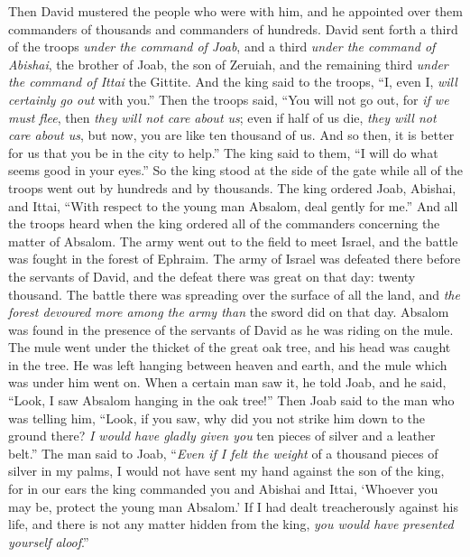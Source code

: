 \begin{biblechapter} %
 Then David mustered the people who were with him, and he appointed over them commanders of thousands and commanders of hundreds.
\verse David sent forth a third of the troops \textit{under the command of Joab}, and a third \textit{under the command of Abishai}, the brother of Joab, the son of Zeruiah, and the remaining third \textit{under the command of Ittai} the Gittite. And the king said to the troops, “I, even I, \textit{will certainly go out} with you.”
\verse Then the troops said, “You will not go out, for \textit{if we must flee}, then \textit{they will not care about us}; even if half of us die, \textit{they will not care about us}, but now, you are like ten thousand of us. And so then, it is better for us that you be in the city to help.”
\verse The king said to them, “I will do what seems good in your eyes.” So the king stood at the side of the gate while all of the troops went out by hundreds and by thousands.
\verse The king ordered Joab, Abishai, and Ittai, “With respect to the young man Absalom, deal gently for me.” And all the troops heard when the king ordered all of the commanders concerning the matter of Absalom.
\verse The army went out to the field to meet Israel, and the battle was fought in the forest of Ephraim.
\verse The army of Israel was defeated there before the servants of David, and the defeat there was great on that day: twenty thousand.
\verse The battle there was spreading over the surface of all the land, and \textit{the forest devoured more among the army than} the sword did on that day.
\verse Absalom was found in the presence of the servants of David as he was riding on the mule. The mule went under the thicket of the great oak tree, and his head was caught in the tree. He was left hanging between heaven and earth, and the mule which was under him went on.
\verse When a certain man saw it, he told Joab, and he said, “Look, I saw Absalom hanging in the oak tree!”
\verse Then Joab said to the man who was telling him, “Look, if you saw, why did you not strike him down to the ground there? \textit{I would have gladly given you} ten pieces of silver and a leather belt.”
\verse The man said to Joab, “\textit{Even if I felt the weight} of a thousand pieces of silver in my palms, I would not have sent my hand against the son of the king, for in our ears the king commanded you and Abishai and Ittai, ‘Whoever you may be, protect the young man Absalom.’
\verse If I had dealt treacherously against his life, and there is not any matter hidden from the king, \textit{you would have presented yourself aloof}.”

\end{biblechapter}
